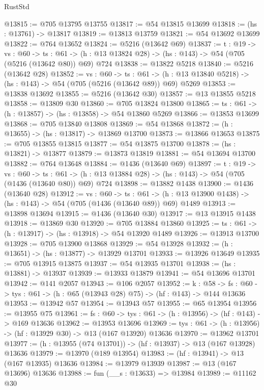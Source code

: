 \begin{lexlean}{RustStd}
\begin{coremodule}
@13815 := @705 @13795 @13755
@13817 := @54 @13815 @13699
@13818 := (hs : @13761) -> @13817
@13819 := @13813 @13759
@13821 := @54 @13692 @13699
@13822 := @764 @13652
@13824 := @5216 (@13642 @69)
@13837 := {t : @19} ->
  {vs : @60} ->
  {ts : @61} -> (h : @13 @13824 @28) -> (hs : @143) -> @54 (@705 (@5216 (@13642 @80)) @69) @724
@13838 := @13822 @5218
@13840 := @5216 (@13642 @28)
@13852 := {vs : @60} ->
  {ts : @61} -> (h : @13 @13840 @5218) -> (hs : @143) -> @54 (@705 (@5216 (@13642 @89)) @69) @5269
@13853 := @13838 @13692
@13855 := @5216 (@13642 @30)
@13857 := @13 @13855 @5218
@13858 := @13809 @30
@13860 := @705 @13824 @13800
@13865 := {ts : @61} -> (h : @13857) -> (hs : @13858) -> @54 @13860 @5269
@13866 := @13853 @13699
@13868 := @705 @13840 @13808
@13869 := @54 @13868
@13872 := (h : @13655) -> (hs : @13817) -> @13869 @13700
@13873 := @13866 @13653
@13875 := @705 @13855 @13815
@13877 := @54 @13875 @13700
@13878 := (hs : @13821) -> @13877
@13879 := @13873 @13819
@13881 := @54 @13694 @13700
@13882 := @764 @13648
@13884 := @1436 (@13640 @69)
@13897 := {t : @19} ->
  {vs : @60} ->
  {ts : @61} -> (h : @13 @13884 @28) -> (hs : @143) -> @54 (@705 (@1436 (@13640 @80)) @69) @724
@13898 := @13882 @1438
@13900 := @1436 (@13640 @28)
@13912 := {vs : @60} ->
  {ts : @61} -> (h : @13 @13900 @1438) -> (hs : @143) -> @54 (@705 (@1436 (@13640 @89)) @69) @1489
@13913 := @13898 @13694
@13915 := @1436 (@13640 @30)
@13917 := @13 @13915 @1438
@13918 := @13869 @30
@13920 := @705 @13884 @13860
@13925 := {ts : @61} -> (h : @13917) -> (hs : @13918) -> @54 @13920 @1489
@13926 := @13913 @13700
@13928 := @705 @13900 @13868
@13929 := @54 @13928
@13932 := (h : @13651) -> (hs : @13877) -> @13929 @13701
@13933 := @13926 @13649
@13935 := @705 @13915 @13875
@13937 := @54 @13935 @13701
@13938 := (hs : @13881) -> @13937
@13939 := @13933 @13879
@13941 := @54 @13696 @13701
@13942 := @141 @2057
@13943 := @106 @2057
@13952 := {k : @58} ->
  {fs : @60} -> {tys : @61} -> (h : @65 (@13943 @28) @75) -> (hf : @143) -> @144 @13636
@13953 := @13942 @57
@13954 := @13943 @57
@13955 := @65 @13954
@13956 := @13955 @75
@13961 := {fs : @60} -> {tys : @61} -> (h : @13956) -> (hf : @143) -> @169 @13636
@13962 := @13953 @13696
@13969 := {tys : @61} -> (h : @13956) -> (hf : @13929 @30) -> @13 (@167 @13920) @13636
@13970 := @13962 @13701
@13977 := (h : @13955 (@74 @13701)) -> (hf : @13937) -> @13 (@167 @13928) @13636
@13979 := @13970 (@189 @13954)
@13983 := (hf : @13941) -> @13 (@167 @13935) @13636
@13984 := @13979 @13939
@13987 := @13 (@167 @13696) @13636
@13988 := fun (__s : @13633) => @13984
@13989 := @11162 @30

\end{coremodule}
\end{lexlean}
